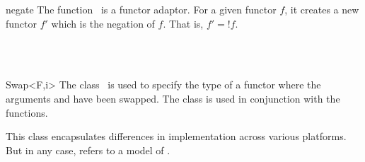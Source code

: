 \begin{ccRefFunction}{negate}
  \ccDefinition The function \ccRefName\ is a functor adaptor. For a
  given functor $f$, it creates a new functor $f'$ which is the
  negation of $f$. That is, $f' = !f$.

  
  
  \ccSeeAlso
  \\
  \\
  
\end{ccRefFunction}

\begin{ccRefClass}{Swap<F,i>}
  \ccDefinition The class \ccRefName\ is used to specify the type of a
  functor where the arguments  and  have been swapped.
  The class is used in conjunction with the  functions.


  \ccTypes
  
   This class encapsulates differences in
  implementation across various platforms. But in any case, 
  refers to a model of .

  \ccSeeAlso
  \\
  \\
  \\
  \\
  
\end{ccRefClass}

